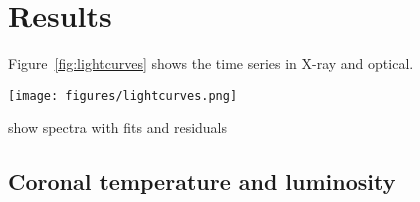 \documentclass[twocolumn]{aastex631}
\begin{document}
\section{Results}

Figure~\ref{fig:lightcurves} shows the time series in X-ray and optical. 

\begin{figure*}[ht!]
    \begin{centering}
        \texttt{[image: figures/lightcurves.png]}
        \caption{
         Top panel: Optical Monitoring (OM) light curve. Bottom panel: X-ray (PN, MOS1 and MOS2 combined) light curve. 
        }
        \label{fig:lightcurves}
    \end{centering}
\end{figure*}


show spectra with fits and residuals


\subsection{Coronal temperature and luminosity}


%     


\end{document}
